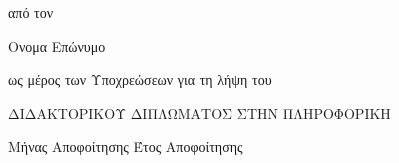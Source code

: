 \documentclass{cseuoi-thesis}
\renewcommand{\listfigurename}{List of Figures}
\renewcommand{\listtablename}{List of Tables}
\theoremstyle{plain}   %
\theoremstyle{plain}   %
\theoremstyle{plain}   %
\theoremstyle{plain}   %
\theoremstyle{definition}  %
\theoremstyle{definition}  %
\theoremstyle{plain}  %
\begin{document}
\begin{titlepage}
\begin{center}
\vspace{0.5in} {\Large από τον }

\vspace{0.7in} {\LARGE Ονομα Επώνυμο}

\vspace{0.5in} {\Large ως μέρος των Υποχρεώσεων για τη λήψη του}

\vspace{0.7in} {\Large ΔΙΔΑΚΤΟΡΙΚΟΥ ΔΙΠΛΩΜΑΤΟΣ ΣΤΗΝ ΠΛΗΡΟΦΟΡΙΚΗ}

\par
\vspace{2.2in} {\Large Μήνας Αποφοίτησης Έτος Αποφοίτησης}
\par\vspace{0.6in}
\end{center}
\thispagestyle{empty}
\end{titlepage}









\tableofcontents

\listoffigures


\listoftables


















\printindex




\end{document}
